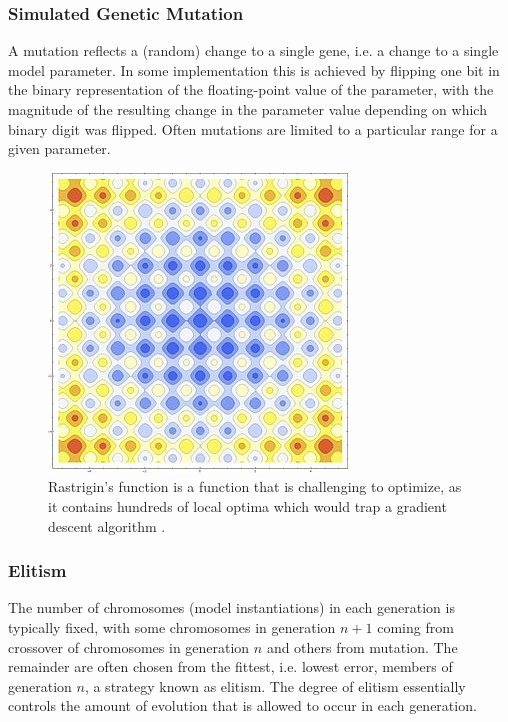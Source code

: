 \subsubsection{Simulated Genetic Mutation}
A mutation reflects a (random) change to a single gene, i.e. a change to a single model parameter.  In some implementation this is achieved by flipping one bit in the binary representation of the floating-point value of the parameter, with the magnitude of the resulting change in the parameter value depending on which binary digit was flipped.  Often mutations are limited to a particular range for a given parameter.
\begin{figure}
\begin{center}

\includegraphics[scale=0.5]{figures/rastagrind}
\caption{Rastrigin's function is a function that is challenging to optimize, as it contains hundreds of local optima which would trap a gradient descent algorithm \cite{rastrigin1974systems}.}
\label{fig:rastrigin}

\end{center}

\end{figure}

\subsubsection{Elitism}
The number of chromosomes (model instantiations) in each generation is typically fixed, with some chromosomes in generation $n+1$ coming from crossover of chromosomes in generation $n$ and others from mutation.
The remainder are often chosen from the fittest, i.e. lowest error, members of generation $n$, a strategy known as elitism.
The degree of elitism essentially controls the amount of evolution that is allowed to occur in each generation.

